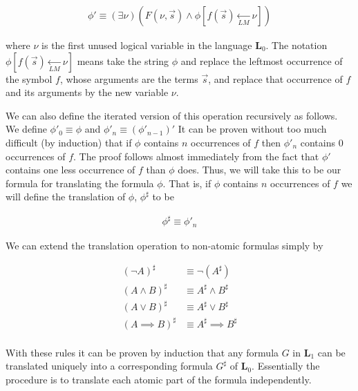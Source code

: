 \documentclass[12pt]{article}
\newcommand{\bv}[1]{\boldsymbol{#1}}
\newcommand{\lm}{\xleftarrow[LM]{}}
\begin{document}
\begin{align}
\phi' \equiv (\exists \nu)\left(F(\nu, \vec{s}) \land \phi\left[f(\vec{s}) \lm \nu \right] \right)
\end{align}

where $\nu$ is the first unused logical variable in the language $\bv{L}_0$. The notation $\phi\left[f(\vec{s}) \lm \nu \right]$ means take the string $\phi$ and replace the leftmost occurrence of the symbol $f$, whose arguments are the terms $\vec{s}$, and replace that occurrence of $f$ and its arguments by the new variable $\nu$.

We can also define the iterated version of this operation recursively as follows. We define $\phi'_0 \equiv \phi$ and $\phi'_n \equiv \left(\phi'_{n-1}\right)'$ It can be proven without too much difficult (by induction) that if $\phi$ contains $n$ occurrences of $f$ then $\phi'_n$ contains 0 occurrences of $f$. The proof follows almost immediately from the fact that $\phi'$ contains one less occurrence of $f$ than $\phi$ does. Thus, we will take this to be our formula for translating the formula $\phi$. That is, if $\phi$ contains $n$ occurrences of $f$ we will define the translation of $\phi$, $\phi^{\sharp}$ to be

\begin{align}
\phi^{\sharp} \equiv \phi'_n
\end{align}

We can extend the translation operation to non-atomic formulas simply by

\begin{align}
\left(\lnot A\right)^{\sharp} & \equiv \lnot \left( A^{\sharp}\right)\\
\left( A \land B\right)^{\sharp} & \equiv A^{\sharp} \land B^{\sharp}\\
\left( A \lor B \right)^{\sharp} & \equiv A^{\sharp} \lor B^{\sharp}\\
\left( A \implies B \right)^{\sharp} & \equiv A^{\sharp} \implies B^{\sharp}\\
\end{align}

With these rules it can be proven by induction that any formula $G$ in $\bv{L}_1$ can be translated uniquely into a corresponding formula $G^{\sharp}$ of $\bv{L}_0$. Essentially the procedure is to translate each atomic part of the formula independently.
\end{document}
